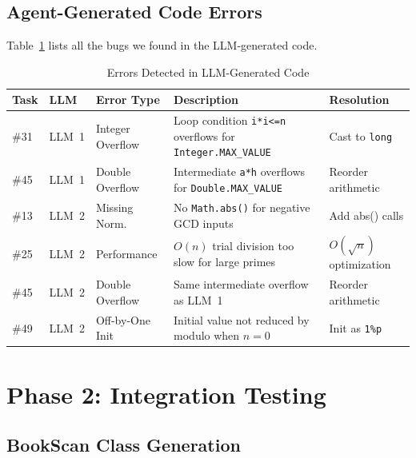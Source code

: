 \documentclass[12pt, a4paper]{article}
\begin{document}
\subsection{Agent-Generated Code Errors}

Table~\ref{tab:code-errors} lists all the bugs we found in the LLM-generated code.

\begin{table}[H]
\centering
\caption{Errors Detected in LLM-Generated Code}
\label{tab:code-errors}
\begin{tabularx}{\textwidth}{l l l >{\raggedright\arraybackslash}X >{\raggedright\arraybackslash}p{3.5cm}}
\toprule
\textbf{Task} & \textbf{LLM} & \textbf{Error Type} & \textbf{Description} & \textbf{Resolution} \\
\midrule
\#31 & LLM~1 & Integer Overflow & Loop condition \texttt{i*i<=n} overflows for \texttt{Integer.MAX\_VALUE} & Cast to \texttt{long} \\
\addlinespace
\#45 & LLM~1 & Double Overflow & Intermediate \texttt{a*h} overflows for \texttt{Double.MAX\_VALUE} & Reorder arithmetic \\
\addlinespace
\#13 & LLM~2 & Missing Norm. & No \texttt{Math.abs()} for negative GCD inputs & Add abs() calls \\
\addlinespace
\#25 & LLM~2 & Performance & $O(n)$ trial division too slow for large primes & $O(\sqrt{n})$ optimization \\
\addlinespace
\#45 & LLM~2 & Double Overflow & Same intermediate overflow as LLM~1 & Reorder arithmetic \\
\addlinespace
\#49 & LLM~2 & Off-by-One Init & Initial value not reduced by modulo when $n=0$ & Init as \texttt{1\%p} \\
\bottomrule
\end{tabularx}
\end{table}

\section{Phase 2: Integration Testing}
\label{sec:phase2}

\subsection{BookScan Class Generation}
\end{document}
